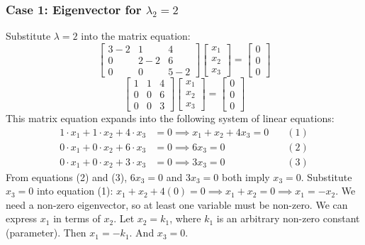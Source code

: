 \documentclass{article}
\begin{document}
\subsubsection*{Case 1: Eigenvector for $\lambda_2 = 2$} %
Substitute $\lambda = 2$ into the matrix equation:
\[ \begin{bmatrix} 3 - 2 & 1 & 4 \\ 0 & 2 - 2 & 6 \\ 0 & 0 & 5 - 2 \end{bmatrix} \begin{bmatrix} x_1 \\ x_2 \\ x_3 \end{bmatrix} = \begin{bmatrix} 0 \\ 0 \\ 0 \end{bmatrix} \]
\[ \begin{bmatrix} 1 & 1 & 4 \\ 0 & 0 & 6 \\ 0 & 0 & 3 \end{bmatrix} \begin{bmatrix} x_1 \\ x_2 \\ x_3 \end{bmatrix} = \begin{bmatrix} 0 \\ 0 \\ 0 \end{bmatrix} \]
This matrix equation expands into the following system of linear equations:
\begin{align*} 1 \cdot x_1 + 1 \cdot x_2 + 4 \cdot x_3 &= 0 \implies x_1 + x_2 + 4x_3 = 0 \quad &(1) \\ 0 \cdot x_1 + 0 \cdot x_2 + 6 \cdot x_3 &= 0 \implies 6x_3 = 0 \quad &(2) \\ 0 \cdot x_1 + 0 \cdot x_2 + 3 \cdot x_3 &= 0 \implies 3x_3 = 0 \quad &(3) \end{align*}
From equations (2) and (3), $6x_3 = 0$ and $3x_3 = 0$ both imply $x_3 = 0$.
Substitute $x_3 = 0$ into equation (1):
$x_1 + x_2 + 4(0) = 0 \implies x_1 + x_2 = 0 \implies x_1 = -x_2$.
We need a non-zero eigenvector, so at least one variable must be non-zero. We can express $x_1$ in terms of $x_2$. Let $x_2 = k_1$, where $k_1$ is an arbitrary non-zero constant (parameter).
Then $x_1 = -k_1$. And $x_3 = 0$.
\end{document}
